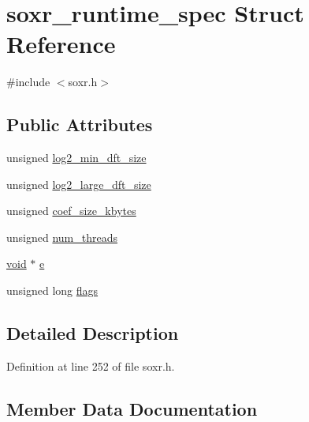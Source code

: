 \hypertarget{structsoxr__runtime__spec}{}\section{soxr\+\_\+runtime\+\_\+spec Struct Reference}
\label{structsoxr__runtime__spec}


{\ttfamily \#include $<$soxr.\+h$>$}

\subsection*{Public Attributes}
\begin{DoxyCompactItemize}
\item 
unsigned \hyperlink{structsoxr__runtime__spec_a6e1d0c0e5099f2f575d5029a0aae121d}{log2\+\_\+min\+\_\+dft\+\_\+size}
\item 
unsigned \hyperlink{structsoxr__runtime__spec_ad9fd2490deceec50026bfc54b6486cb2}{log2\+\_\+large\+\_\+dft\+\_\+size}
\item 
unsigned \hyperlink{structsoxr__runtime__spec_ab54d2119bf00a8060aec27c6fe09a125}{coef\+\_\+size\+\_\+kbytes}
\item 
unsigned \hyperlink{structsoxr__runtime__spec_a2347bb798d0890828e2f03d165e80dd1}{num\+\_\+threads}
\item 
\hyperlink{sound_8c_ae35f5844602719cf66324f4de2a658b3}{void} $\ast$ \hyperlink{structsoxr__runtime__spec_a41f0eaf7fc642056411684a9b06a3385}{e}
\item 
unsigned long \hyperlink{structsoxr__runtime__spec_a35b619aa4322f91fa5a2c06b148c9f2a}{flags}
\end{DoxyCompactItemize}


\subsection{Detailed Description}


Definition at line 252 of file soxr.\+h.



\subsection{Member Data Documentation}
